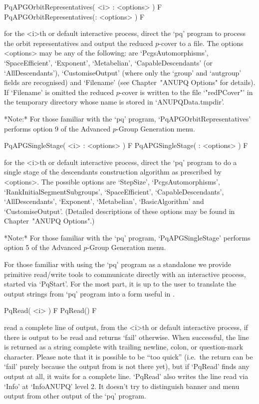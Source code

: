 \>PqAPGOrbitRepresentatives( <i> : <options> ) F
\>PqAPGOrbitRepresentatives(: <options> ) F

for the <i>th or default interactive {\ANUPQ} process,  direct  the  `pq'
program to process  the  orbit  representatives  and  output  the  reduced
$p$-cover to a file. The options <options> may be any of  the  following:
are  `PcgsAutomorphisms',  `SpaceEfficient',  `Exponent',   `Metabelian',
`CapableDescendants' (or `AllDescendants'), `CustomiseOutput' (where only
the `group' and `autgroup' fields are  recognised)  and  `Filename'  (see
Chapter~"ANUPQ Options"  for  details).  If  `Filename'  is  omitted  the
reduced $p$-cover is written to the file `"redPCover"' in  the  temporary
directory whose name is stored in `ANUPQData.tmpdir'.

*Note:*
For those familiar  with  the  `pq'  program,  `PqAPGOrbitRepresentatives'
performs option 9 of the Advanced $p$-Group Generation menu.

\>PqAPGSingleStage( <i> : <options> ) F
\>PqAPGSingleStage( : <options> ) F

for the <i>th or default interactive {\ANUPQ} process,  direct  the  `pq'
program to do a single stage of the descendants construction algorithm as
prescribed  by  <options>.   The   possible   options   are   `StepSize',
`PcgsAutomorphisms',   `RankInitialSegmentSubgroups',   `SpaceEfficient',
`CapableDescendants',   `AllDescendants',    `Exponent',    `Metabelian',
`BasicAlgorithm' and `CustomiseOutput'. (Detailed descriptions  of  these
options may be found in Chapter~"ANUPQ Options".)

*Note:*
For those familiar with  the  `pq'  program,  `PqAPGSingleStage'  performs
option 5 of the Advanced $p$-Group Generation menu.


For those familiar with using the `pq' program as a standalone we  provide
primitive read/write tools to communicate directly  with  an  interactive
{\ANUPQ} process, started via `PqStart'. For the most part, it is  up  to
the user to translate the output strings from `pq'  program  into  a  form
useful in {\GAP}.

\>PqRead( <i> ) F
\>PqRead() F

read a complete line of  {\ANUPQ}  output,  from  the  <i>th  or  default
interactive {\ANUPQ} process, if there is output to be read  and  returns
`fail' otherwise. When successful, the  line  is  returned  as  a  string
complete with trailing newline, colon, or question-mark character. Please
note that it is possible to be ``too  quick''  (i.e.~the  return  can  be
`fail' purely because the output from {\ANUPQ} is not there yet), but  if
`PqRead' finds any output at all, it waits for a complete line.  `PqRead'
also writes the line read via `Info' at `InfoANUPQ' level 2.  It  doesn't
try to distinguish banner and menu output from other output of  the  `pq'
program.

